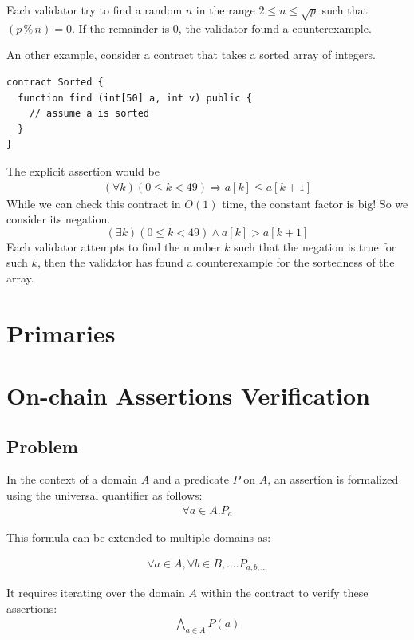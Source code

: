 \documentclass[runningheads]{llncs}
\begin{document}
Each validator try to find  a
random $n$ in the range $2 \le n \le 
\sqrt p$ such that $(p \mathbin{\%} n) = 0$. If the remainder is $0$, the validator found a counterexample.

An other example, consider a contract that takes a sorted array of integers.
\begin{lstlisting}[numbers=none]
contract Sorted {
  function find (int[50] a, int v) public {
    // assume a is sorted
  }
}
\end{lstlisting}
The explicit assertion would be
\begin{gather}\label{eq:1}
  (\forall k) (0\le k <49) \Rightarrow a[k] \le a[k+1]
\end{gather}
While we can check this contract in $O(1)$ time, the constant factor is big! So we
consider its negation.
\begin{displaymath}
  (\exists k) (0\le k <49) \wedge a[k] > a[k+1]
\end{displaymath}
Each validator attempts to find the number $k$ such that the negation is true for such $k$, then the validator has found a counterexample for the sortedness of the array.
\section{Primaries}
\label{sec:primaries}


\section{On-chain Assertions Verification}
\label{sec:assertion-verification-onchain}
\subsection{Problem}

In the context of a domain $A$ and a predicate $P$ on $A$, an assertion is formalized using the universal quantifier as follows:
\begin{gather}
  \label{eq:1}
\forall a \in A. P_{a}
\end{gather}

This formula can be extended to multiple domains as:

\begin{gather}
\label{eq:2}
\forall a \in A, \forall b \in B, \dots .P_{a, b, \dots}
\end{gather} 

It requires iterating over the domain \( A \) within the contract to verify these assertions:
\begin{gather}
  \label{eq:3}
  \bigwedge_{a \in A} P(a)
\end{gather}
\end{document}
